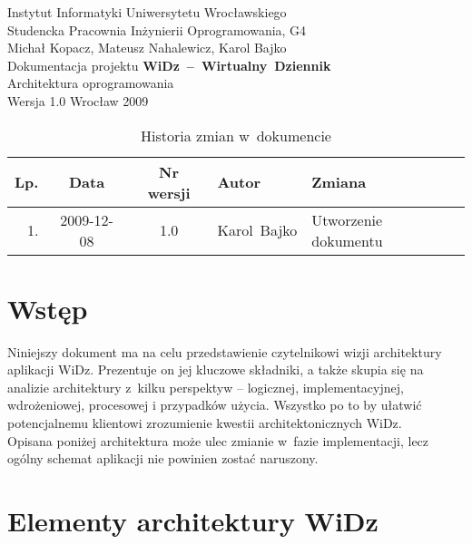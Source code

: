 \documentclass[12pt,leqno,twoside]{mwart}
\begin{document}
\begin{titlepage}
\begin{center}
Instytut Informatyki Uniwersytetu Wrocławskiego \\
Studencka Pracownia Inżynierii Oprogramowania, G4 \\
\vspace{4cm}
\Large Michał Kopacz, Mateusz Nahalewicz, Karol Bajko \\
\vspace{0.5cm}
\huge Dokumentacja projektu \mbox{\textbf{WiDz -- Wirtualny Dziennik}} \\ \Large Architektura oprogramowania\\
\vspace{1cm}
\normalsize Wersja 1.0
\vfill
\normalsize Wrocław 2009
\end{center}
\end{titlepage}

\newpage
\vfill
\begin{table}[tb]
	\centering
	\caption{Historia zmian w~dokumencie}
		\begin{tabular}{|r|c|c|p{}|l|}
		\hline
		Lp. 	& Data       & Nr wersji 	& Autor           		& Zmiana \\ \hline
		1.   	& 2009-12-08 & 1.0       	& \mbox{Karol Bajko} & Utworzenie dokumentu \\ \hline
		\end{tabular}
\end{table}

\tableofcontents
\newpage

\section{Wstęp}
\noindent Niniejszy dokument ma na celu przedstawienie czytelnikowi wizji architektury aplikacji WiDz. Prezentuje on jej kluczowe składniki, a także skupia się na analizie architektury z~kilku perspektyw -- logicznej, implementacyjnej, wdrożeniowej, procesowej i przypadków użycia. Wszystko po to by ułatwić potencjalnemu klientowi zrozumienie kwestii architektonicznych WiDz.\\
\indent Opisana poniżej architektura może ulec zmianie w~fazie implementacji, lecz ogólny schemat aplikacji nie powinien zostać naruszony.

\section{Elementy architektury WiDz}
\end{document}
